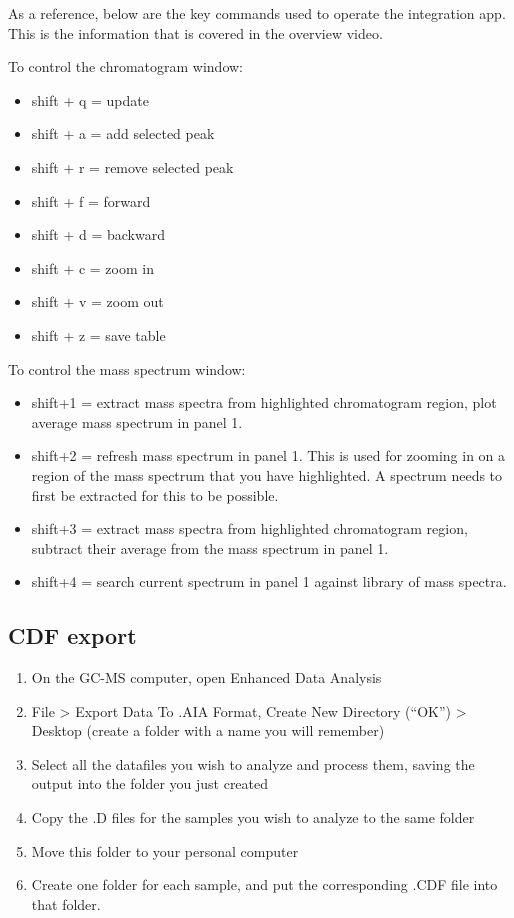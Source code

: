 \documentclass[
]{krantz}
\providecommand{\tightlist}{%
  \setlength{\itemsep}{0pt}\setlength{\parskip}{0pt}}
\begin{document}
As a reference, below are the key commands used to operate the integration app. This is the information that is covered in the overview video.

To control the chromatogram window:

\begin{itemize}
\tightlist
\item
  shift + q = update
\item
  shift + a = add selected peak
\item
  shift + r = remove selected peak
\item
  shift + f = forward
\item
  shift + d = backward
\item
  shift + c = zoom in
\item
  shift + v = zoom out
\item
  shift + z = save table
\end{itemize}

To control the mass spectrum window:

\begin{itemize}
\tightlist
\item
  shift+1 = extract mass spectra from highlighted chromatogram region, plot average mass spectrum in panel 1.
\item
  shift+2 = refresh mass spectrum in panel 1. This is used for zooming in on a region of the mass spectrum that you have highlighted. A spectrum needs to first be extracted for this to be possible.
\item
  shift+3 = extract mass spectra from highlighted chromatogram region, subtract their average from the mass spectrum in panel 1.
\item
  shift+4 = search current spectrum in panel 1 against library of mass spectra.
\end{itemize}

\hypertarget{cdf-export}{%
\subsection{CDF export}\label{cdf-export}}

\begin{enumerate}
\def\labelenumi{\arabic{enumi}.}
\tightlist
\item
  On the GC-MS computer, open Enhanced Data Analysis
\item
  File \textgreater{} Export Data To .AIA Format, Create New Directory (``OK'') \textgreater{} Desktop (create a folder with a name you will remember)
\item
  Select all the datafiles you wish to analyze and process them, saving the output into the folder you just created
\item
  Copy the .D files for the samples you wish to analyze to the same folder
\item
  Move this folder to your personal computer
\item
  Create one folder for each sample, and put the corresponding .CDF file into that folder.
\end{enumerate}
\end{document}
